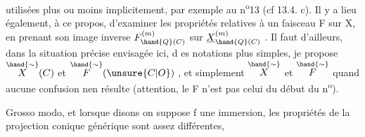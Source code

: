 utilisées plus ou moins implicitement,  par exemple au n\textsuperscript{o}13 
 (cf 13.4. c). Il y a lieu également, à ce propos, d'examiner les
propriétés relatives à un faisceau F sur X,  en prenant son image inverse
$F^{(m)}_{\hand{Q}(C)}$  sur  $\underline{X}^{(m)}_{\hand{Q}(C)}$ . Il faut  d'ailleurs, dans la situation précise
envisagée ici, d es notations plus simples, je propose  $\overset{\hand{\sim}}{X}(C)$ et $\overset{\hand{\sim}}{F}(\unsure{C|O})$ ,
et simplement $\overset{\hand{\sim}}{X}$ et $\overset{\hand{\sim}}{F}$  quand aucune confusion nen résulte  (attention, le
F   n'est pas  celui du début du n\textsuperscript{o}).

Grosso modo, et lorsque  disons on suppose  f une immersion, les
propriétés de la projection conique générique sont assez différentes,

